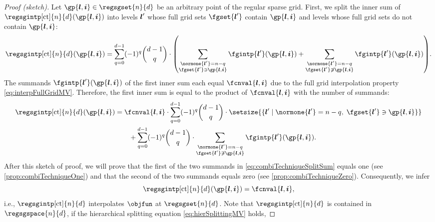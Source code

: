 \begin{proof}[Proof (sketch)]
  Let $\gp{\*l,\*i} \in \regsgset{n}{d}$ be an arbitrary
  point of the regular sparse grid.
  First, we split the inner sum of $\regsgintp[\ct]{n}{d}(\gp{\*l,\*i})$
  into levels ${\boldsymbol{l}}'$ whose full grid sets $\fgset{\*l'}$
  contain $\gp{\*l,\*i}$ and levels whose full grid sets
  do not contain $\gp{\*l,\*i}$:
  \begin{equation}
    \regsgintp[\ct]{n}{d}(\gp{\*l,\*i})
    = \sum_{q=0}^{d-1} (-1)^q \binom{d-1}{q} \cdot \paren*{
      \sum_{\substack{\normone{\*l'} = n - q\\\fgset{\*l'} \ni \gp{\*l,\*i}}}
      \fgintp{\*l'}(\gp{\*l,\*i}) +
      \sum_{\substack{\normone{\*l'} = n - q\\\fgset{\*l'} \notni \gp{\*l,\*i}}}
      \fgintp{\*l'}(\gp{\*l,\*i})
    }.
  \end{equation}
  The summands $\fgintp{\*l'}(\gp{\*l,\*i})$ of the first inner sum
  each equal $\fcnval{\*l,\*i}$ due to the full grid interpolation
  property \eqref{eq:interpFullGridMV}.
  Therefore, the first inner sum is equal to the product of
  $\fcnval{\*l,\*i}$ with the number of summands:
  \begin{equation}
    \label{eq:combiTechniqueSplitSum}
    \begin{split}
      \regsgintp[\ct]{n}{d}(\gp{\*l,\*i})
      &= \fcnval{\*l,\*i} \cdot \sum_{q=0}^{d-1} (-1)^q \binom{d-1}{q} \cdot
      \setsize{
        \{\*l' \mid \normone{\*l'} = n - q,\; \fgset{\*l'} \ni \gp{\*l,\*i}\}
      }\\
      &\qquad{} {} + \sum_{q=0}^{d-1} (-1)^q \binom{d-1}{q} \cdot
      \sum_{\substack{\normone{\*l'} = n - q\\\fgset{\*l'} \notni \gp{\*l,\*i}}}
      \fgintp{\*l'}(\gp{\*l,\*i}).
    \end{split}
  \end{equation}
  After this sketch of proof,
  we will prove that the first of the two summands in
  \cref{eq:combiTechniqueSplitSum}
  equals one (see \cref{prop:combiTechniqueOne})
  and that the second of the two summands
  equals zero (see \cref{prop:combiTechniqueZero}).
  Consequently, we infer
  \begin{equation}
    \regsgintp[\ct]{n}{d}(\gp{\*l,\*i})
    = \fcnval{\*l,\*i},
  \end{equation}
  i.e., $\regsgintp[\ct]{n}{d}$ interpolates $\objfun$ at $\regsgset{n}{d}$.
  Note that $\regsgintp[\ct]{n}{d}$ is contained in $\regsgspace{n}{d}$,
  if the hierarchical splitting equation \eqref{eq:hierSplittingMV} holds,

\end{proof}

